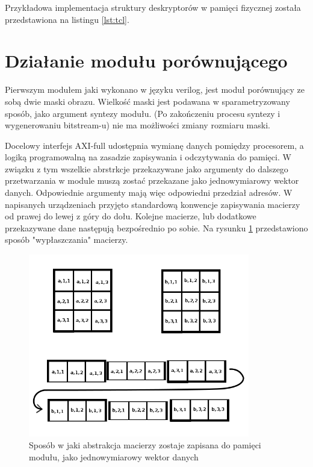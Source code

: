 Przykładowa implementacja struktury deskryptorów w pamięci fizycznej została przedstawiona
na listingu \ref{lst:tcl}.


\section{Działanie modułu porównującego}
\label{sec:logika:matchowanie}

Pierwszym modułem jaki wykonano w języku verilog, jest moduł porównujący ze sobą
dwie maski obrazu. Wielkość maski jest podawana w sparametryzowany sposób, jako
argument syntezy modułu. (Po zakończeniu procesu syntezy i wygenerowaniu bitstream-u)
    nie ma możliwości zmiany rozmiaru maski. 


Docelowy interfejs AXI-full udostępnia wymianę danych pomiędzy procesorem, a logiką
programowalną na zasadzie zapisywania i odczytywania do pamięci. W związku z tym
wszelkie abrstrkcje przekazywane jako argumenty do dalszego przetwarzania w module
muszą zostać przekazane jako jednowymiarowy wektor danych. Odpowiednie argumenty
mają więc odpowiedni przedział adresów.
W napisanych urządzeniach przyjęto standardową konwencje zapisywania macierzy
od prawej do lewej z góry do dołu. Kolejne macierze, lub dodatkowe przekazywane
dane następują bezpośrednio po sobie.
Na rysunku \ref{fig:wyplaszczanie} przedstawiono sposób "wypłaszczania" macierzy.

\begin{figure}[h]
    \begin{center}

    \includegraphics[height = 8cm]{figures/flattern_matrixes.png}
    \caption["Wypłaszczanie macierzy"]{Sposób w jaki abstrakcja macierzy zostaje
        zapisana do pamięci modułu, jako jednowymiarowy wektor danych}
    \label{fig:wyplaszczanie}

    \end{center}
\end{figure}

